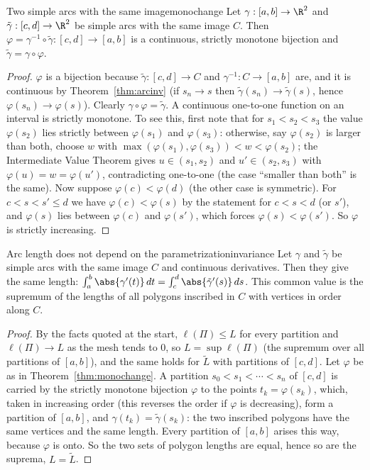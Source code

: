 \documentclass[11pt]{article}
\begin{document}
\begin{thm}{Two simple arcs with the same image}{monochange}
Let $\gamma:[a,b]\to\R^2$ and $\tilde\gamma:[c,d]\to\R^2$ be simple arcs with the same image $C$. Then $\varphi=\gamma^{-1}\circ\tilde\gamma:[c,d]\to[a,b]$ is a continuous, strictly monotone bijection and $\tilde\gamma=\gamma\circ\varphi$.
\end{thm}
\begin{proof}
$\varphi$ is a bijection because $\tilde\gamma:[c,d]\to C$ and $\gamma^{-1}:C\to[a,b]$ are, and it is continuous by Theorem~\ref{thm:arcinv} (if $s_n\to s$ then $\tilde\gamma(s_n)\to\tilde\gamma(s)$, hence $\varphi(s_n)\to\varphi(s)$). Clearly $\gamma\circ\varphi=\tilde\gamma$. A continuous one-to-one function on an interval is strictly monotone. To see this, first note that for $s_1<s_2<s_3$ the value $\varphi(s_2)$ lies strictly between $\varphi(s_1)$ and $\varphi(s_3)$: otherwise, say $\varphi(s_2)$ is larger than both, choose $w$ with $\max(\varphi(s_1),\varphi(s_3))<w<\varphi(s_2)$; the Intermediate Value Theorem gives $u\in(s_1,s_2)$ and $u'\in(s_2,s_3)$ with $\varphi(u)=w=\varphi(u')$, contradicting one-to-one (the case ``smaller than both'' is the same). Now suppose $\varphi(c)<\varphi(d)$ (the other case is symmetric). For $c<s<s'\le d$ we have $\varphi(c)<\varphi(s)$ by the statement for $c<s<d$ (or $s'$), and $\varphi(s)$ lies between $\varphi(c)$ and $\varphi(s')$, which forces $\varphi(s)<\varphi(s')$. So $\varphi$ is strictly increasing.
\end{proof}

\begin{thm}{Arc length does not depend on the parametrization}{invariance}
Let $\gamma$ and $\tilde\gamma$ be simple arcs with the same image $C$ and continuous derivatives. Then they give the same length: $\int_a^b\abs{\gamma'(t)}\,dt=\int_c^d\abs{\tilde\gamma'(s)}\,ds$. This common value is the supremum of the lengths of all polygons inscribed in $C$ with vertices in order along $C$.
\end{thm}
\begin{proof}
By the facts quoted at the start, $\ell(\Pi)\le L$ for every partition and $\ell(\Pi)\to L$ as the mesh tends to $0$, so $L=\sup\ell(\Pi)$ (the supremum over all partitions of $[a,b]$), and the same holds for $\tilde L$ with partitions of $[c,d]$. Let $\varphi$ be as in Theorem~\ref{thm:monochange}. A partition $s_0<s_1<\cdots<s_n$ of $[c,d]$ is carried by the strictly monotone bijection $\varphi$ to the points $t_k=\varphi(s_k)$, which, taken in increasing order (this reverses the order if $\varphi$ is decreasing), form a partition of $[a,b]$, and $\gamma(t_k)=\tilde\gamma(s_k)$: the two inscribed polygons have the same vertices and the same length. Every partition of $[a,b]$ arises this way, because $\varphi$ is onto. So the two sets of polygon lengths are equal, hence so are the suprema, $L=\tilde L$.
\end{proof}
\end{document}
